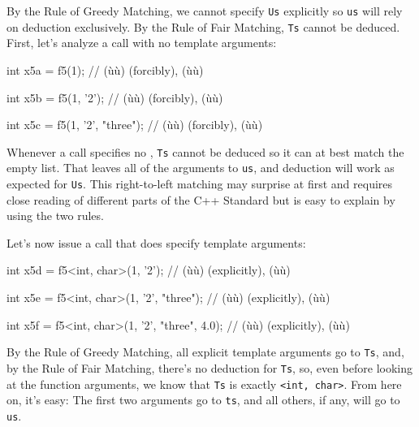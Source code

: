 \noindent By the Rule of Greedy Matching, we cannot specify \lstinline!Us! explicitly
so \lstinline!us! will rely on deduction exclusively. By the Rule of Fair
Matching, \lstinline!Ts! cannot be deduced. First, let's analyze a call
with no template arguments:

\begin{emcppslisting}[emcppsbatch=e21]
int x5a = f5(1);
    // (ù{}ù) (forcibly), (ù{}ù)

int x5b = f5(1, '2');
    // (ù{}ù) (forcibly), (ù{}ù)

int x5c = f5(1, '2', "three");
    // (ù{}ù) (forcibly), (ù{}ù)
\end{emcppslisting}
    

\noindent Whenever a call specifies no , \lstinline!Ts!
cannot be deduced so it can at best match the empty list. That leaves
all of the arguments to \lstinline!us!, and deduction will work as expected
for \lstinline!Us!. This right-to-left matching may surprise at first and
requires close reading of different parts of the C++ Standard but is
easy to explain by using the two rules.

Let's now issue a call that does specify template arguments:

\begin{emcppslisting}[emcppsbatch=e21]
int x5d = f5<int, char>(1, '2');
    // (ù{}ù) (explicitly), (ù{}ù)

int x5e = f5<int, char>(1, '2', "three");
    // (ù{}ù) (explicitly), (ù{}ù)

int x5f = f5<int, char>(1, '2', "three", 4.0);
    // (ù{}ù) (explicitly), (ù{}ù)
\end{emcppslisting}
    

\noindent By the Rule of Greedy Matching, all explicit template arguments go to
\lstinline!Ts!, and, by the Rule of Fair Matching, there's no deduction for
\lstinline!Ts!, so, even before looking at the function arguments, we know
that \lstinline!Ts! is exactly \lstinline!<int,!~\lstinline!char>!. From here on,
it's easy: The first two arguments go to \lstinline!ts!, and all others, if
any, will go to \lstinline!us!.

